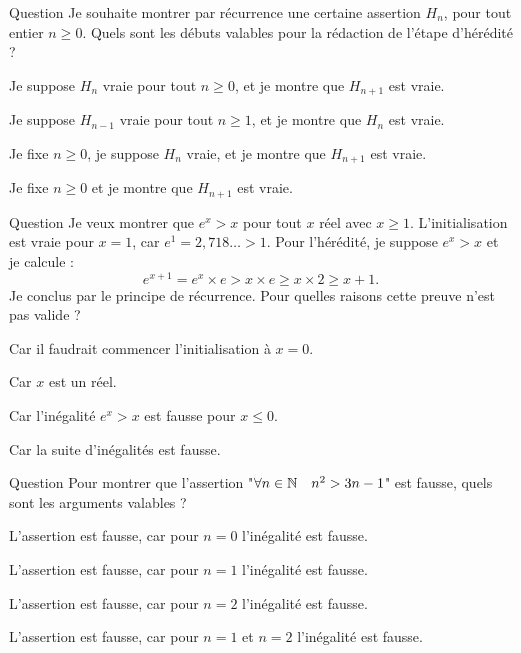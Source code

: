\begin{multi}[multiple,feedback=
{La récurrence a une rédaction très rigide. Sinon on raconte vite n'importe quoi !
}]{Question}
Je souhaite montrer par récurrence une certaine assertion \(H_n\), pour tout entier \(n\ge0\).
Quels sont les débuts valables pour la rédaction de l'étape d'hérédité ?

    \item Je suppose \(H_n\) vraie pour tout \(n\ge0\), et je montre que \(H_{n+1}\) est vraie.
    \item Je suppose \(H_{n-1}\) vraie pour tout \(n\ge1\), et je montre que \(H_{n}\) est vraie.
    \item* Je fixe \(n\ge0\), je suppose \(H_n\) vraie, et je montre que \(H_{n+1}\) est vraie.
    \item Je fixe \(n\ge0\) et je montre que \(H_{n+1}\) est vraie.
\end{multi}


\begin{multi}[multiple,feedback=
{La récurrence c'est uniquement avec des entiers !
}]{Question}
Je veux montrer que \(e^x > x\) pour tout \(x\) réel avec \(x \ge 1\).
L'initialisation est vraie pour \(x=1\), car \(e^1 = 2,718\ldots >1\).
Pour l'hérédité, je suppose \(e^x>x\) et je calcule :
\[e^{x+1} = e^x \times e > x  \times e \ge x \times 2 \ge x + 1.\]
Je conclus par le principe de récurrence.
Pour quelles raisons cette preuve n'est pas valide ?

    \item Car il faudrait commencer l'initialisation à \(x=0\).
    \item* Car \(x\) est un réel.
    \item Car l'inégalité \(e^x > x\) est fausse pour \(x\le0\).
    \item Car la suite d'inégalités est fausse.
\end{multi}


\begin{multi}[multiple,feedback=
{C'est faux pour \(n=1\) et \(n=2\), mais bien sûr, un seul cas suffit pour que l'assertion soit fausse. 
}]{Question}
Pour montrer que l'assertion 
"\(\forall n \in \mathbb{N} \quad n^2 > 3n-1\)" est fausse,
quels sont les arguments valables ?

    \item L'assertion est fausse, car pour \(n=0\) l'inégalité est fausse.
    \item* L'assertion est fausse, car pour \(n=1\) l'inégalité est fausse.
    \item* L'assertion est fausse, car pour \(n=2\) l'inégalité est fausse.
    \item* L'assertion est fausse, car pour \(n=1\) et \(n=2\) l'inégalité est fausse.
\end{multi}


